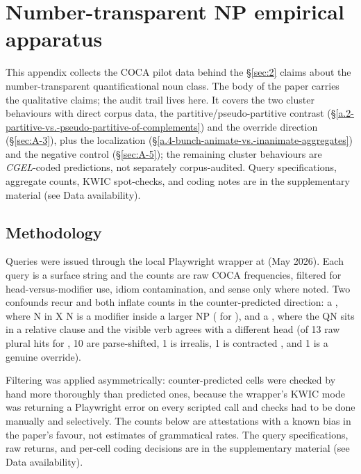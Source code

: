 \section{Number-transparent NP empirical apparatus}

This appendix collects the COCA pilot data behind the §\ref{sec:2} claims about the number-transparent quantificational noun class. The body of the paper carries the qualitative claims; the audit trail lives here. It covers the two cluster behaviours with direct corpus data, the partitive/pseudo-partitive contrast (§\ref{a.2-partitive-vs.-pseudo-partitive-of-complements}) and the override direction (§\ref{sec:A-3}), plus the  localization (§\ref{a.4-bunch-animate-vs.-inanimate-aggregates}) and the negative control (§\ref{sec:A-5}); the remaining cluster behaviours are \textit{CGEL}-coded predictions, not separately corpus-audited. Query specifications, aggregate counts, KWIC spot-checks, and coding notes are in the supplementary material (see Data availability).

\subsection{Methodology}

Queries were issued through the local Playwright wrapper at  (May 2026). Each query is a surface string and the counts are raw COCA frequencies, filtered for head-versus-modifier use, idiom contamination, and sense only where noted. Two confounds recur and both inflate counts in the counter-predicted direction: a , where N in X  N is a modifier inside a larger NP ( for ), and a , where the QN sits in a relative clause and the visible verb agrees with a different head (of 13 raw plural hits for , 10 are parse-shifted, 1 is irrealis, 1 is contracted , and 1 is a genuine override).

Filtering was applied asymmetrically: counter-predicted cells were checked by hand more thoroughly than predicted ones, because the wrapper's KWIC mode was returning a Playwright error on every scripted call and checks had to be done manually and selectively. The counts below are attestations with a known bias in the paper's favour, not estimates of grammatical rates. The query specifications, raw returns, and per-cell coding decisions are in the supplementary material (see Data availability).

